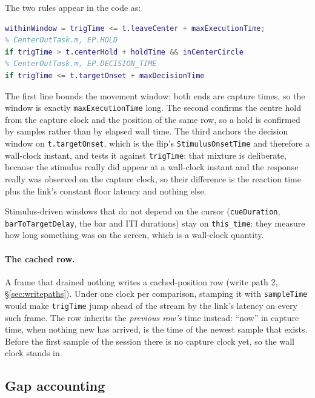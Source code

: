 \documentclass[11pt,a4paper]{article}
\newcommand{\code}[1]{\texttt{\small #1}}
\begin{document}
The two rules appear in the code as:

\begin{lstlisting}[language=Matlab]
% CenterOutTask.m, EP.MOVEMENT
withinWindow = trigTime <= t.leaveCenter + maxExecutionTime;
% CenterOutTask.m, EP.HOLD
if trigTime > t.centerHold + holdTime && inCenterCircle
% CenterOutTask.m, EP.DECISION_TIME
if trigTime <= t.targetOnset + maxDecisionTime
\end{lstlisting}

\noindent
The first line bounds the movement window: both ends are capture times, so the
window is exactly \code{maxExecutionTime} long. The second confirms the centre
hold from the capture clock and the position of the same row, so a hold is
confirmed by samples rather than by elapsed wall time. The third anchors the
decision window on \code{t.targetOnset}, which is the flip's
\code{StimulusOnsetTime} and therefore a wall-clock instant, and tests it against
\code{trigTime}: that mixture is deliberate, because the stimulus really did
appear at a wall-clock instant and the response really was observed on the
capture clock, so their difference is the reaction time plus the link's constant
floor latency and nothing else.

Stimulus-driven windows that do not depend on the cursor (\code{cueDuration},
\code{barToTargetDelay}, the bar and ITI durations) stay on \code{this\_time}:
they measure how long something was on the screen, which is a wall-clock
quantity.

\paragraph{The cached row.} A frame that drained nothing writes a
cached-position row (write path 2, \S\ref{sec:writepaths}). Under one clock per
comparison, stamping it with \code{sampleTime} would make \code{trigTime} jump
ahead of the stream by the link's latency on every such frame. The row inherits
the \emph{previous row's} time instead: ``now'' in capture time, when nothing
new has arrived, is the time of the newest sample that exists. Before the first
sample of the session there is no capture clock yet, so the wall clock stands in.

\subsection{Gap accounting}
\end{document}
